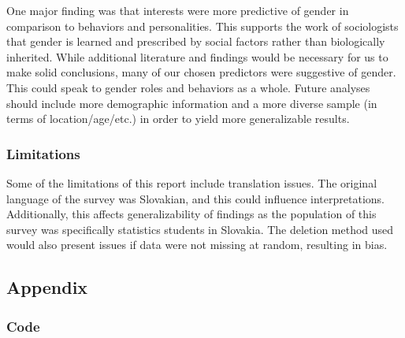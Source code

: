 \documentclass[]{article}
\begin{document}
One major finding was that interests were more predictive of gender in
comparison to behaviors and personalities. This supports the work of
sociologists that gender is learned and prescribed by social factors
rather than biologically inherited. While additional literature and
findings would be necessary for us to make solid conclusions, many of
our chosen predictors were suggestive of gender. This could speak to
gender roles and behaviors as a whole. Future analyses should include
more demographic information and a more diverse sample (in terms of
location/age/etc.) in order to yield more generalizable results.

\subsubsection{Limitations}\label{limitations}

Some of the limitations of this report include translation issues. The
original language of the survey was Slovakian, and this could influence
interpretations. Additionally, this affects generalizability of findings
as the population of this survey was specifically statistics students in
Slovakia. The deletion method used would also present issues if data
were not missing at random, resulting in bias.

\newpage

\subsection{Appendix}\label{appendix}

\subsubsection{Code}\label{code}
\end{document}
